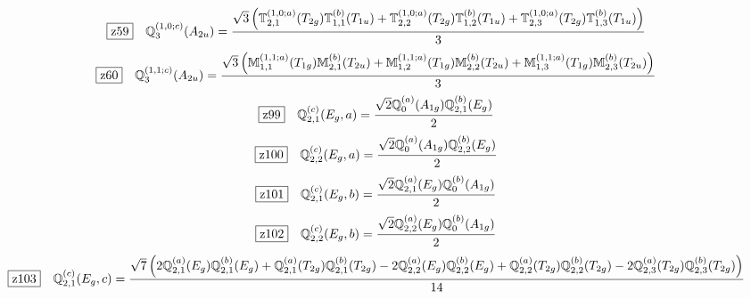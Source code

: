 \documentclass[fleqn,10pt,landscape]{jsarticle}
\begin{document}
\begin{dmath*}
\hspace*{3mm}\fbox{z59}\quad \mathbb{Q}_{3}^{(1,0;c)}(A_{2u})=\frac{\sqrt{3} \left(\mathbb{T}_{2,1}^{(1,0;a)}(T_{2g}) \mathbb{T}_{1,1}^{(b)}(T_{1u}) + \mathbb{T}_{2,2}^{(1,0;a)}(T_{2g}) \mathbb{T}_{1,2}^{(b)}(T_{1u}) + \mathbb{T}_{2,3}^{(1,0;a)}(T_{2g}) \mathbb{T}_{1,3}^{(b)}(T_{1u})\right)}{3}
\end{dmath*}
\begin{dmath*}
\hspace*{3mm}\fbox{z60}\quad \mathbb{Q}_{3}^{(1,1;c)}(A_{2u})=\frac{\sqrt{3} \left(\mathbb{M}_{1,1}^{(1,1;a)}(T_{1g}) \mathbb{M}_{2,1}^{(b)}(T_{2u}) + \mathbb{M}_{1,2}^{(1,1;a)}(T_{1g}) \mathbb{M}_{2,2}^{(b)}(T_{2u}) + \mathbb{M}_{1,3}^{(1,1;a)}(T_{1g}) \mathbb{M}_{2,3}^{(b)}(T_{2u})\right)}{3}
\end{dmath*}
\begin{dmath*}
\hspace*{3mm}\fbox{z99}\quad \mathbb{Q}_{2,1}^{(c)}(E_{g},a)=\frac{\sqrt{2} \mathbb{Q}_{0}^{(a)}(A_{1g}) \mathbb{Q}_{2,1}^{(b)}(E_{g})}{2}
\end{dmath*}
\begin{dmath*}
\hspace*{3mm}\fbox{z100}\quad \mathbb{Q}_{2,2}^{(c)}(E_{g},a)=\frac{\sqrt{2} \mathbb{Q}_{0}^{(a)}(A_{1g}) \mathbb{Q}_{2,2}^{(b)}(E_{g})}{2}
\end{dmath*}
\begin{dmath*}
\hspace*{3mm}\fbox{z101}\quad \mathbb{Q}_{2,1}^{(c)}(E_{g},b)=\frac{\sqrt{2} \mathbb{Q}_{2,1}^{(a)}(E_{g}) \mathbb{Q}_{0}^{(b)}(A_{1g})}{2}
\end{dmath*}
\begin{dmath*}
\hspace*{3mm}\fbox{z102}\quad \mathbb{Q}_{2,2}^{(c)}(E_{g},b)=\frac{\sqrt{2} \mathbb{Q}_{2,2}^{(a)}(E_{g}) \mathbb{Q}_{0}^{(b)}(A_{1g})}{2}
\end{dmath*}
\begin{dmath*}
\hspace*{3mm}\fbox{z103}\quad \mathbb{Q}_{2,1}^{(c)}(E_{g},c)=\frac{\sqrt{7} \left(2 \mathbb{Q}_{2,1}^{(a)}(E_{g}) \mathbb{Q}_{2,1}^{(b)}(E_{g}) + \mathbb{Q}_{2,1}^{(a)}(T_{2g}) \mathbb{Q}_{2,1}^{(b)}(T_{2g}) - 2 \mathbb{Q}_{2,2}^{(a)}(E_{g}) \mathbb{Q}_{2,2}^{(b)}(E_{g}) + \mathbb{Q}_{2,2}^{(a)}(T_{2g}) \mathbb{Q}_{2,2}^{(b)}(T_{2g}) - 2 \mathbb{Q}_{2,3}^{(a)}(T_{2g}) \mathbb{Q}_{2,3}^{(b)}(T_{2g})\right)}{14}
\end{dmath*}
\end{document}
